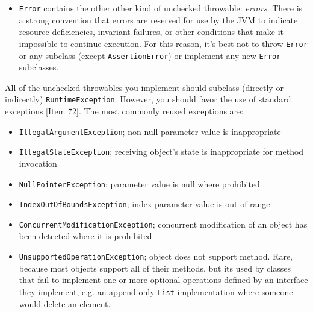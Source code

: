 \documentclass[table, xcdraw]{article}%
\begin{document}
\begin{itemize}
    All exceptions under \texttt{Exception} are checked, except those in subclass:
    \begin{itemize}
        \item \texttt{RuntimeException} contains \emph{unchecked exceptions}, which are not checked at compile time and are not required to -- and generally shouldn't -- be caught or declared in a \texttt{throws} clause.\footnote{In C++, all exceptions are unchecked, where it is up to the programmers to specify or catch the exceptions.} Recovery is often impossible and continued execution would do more harm than good. \emph{Runtime exceptions} should be used to indicate programming errors, most of which violate precondition violations (e.g. \texttt{IndexOutOfBoundsException}).
    \end{itemize}
    \item \texttt{Error} contains the other other kind of unchecked throwable: \emph{errors}. There is a strong convention that errors are reserved for use by the JVM to indicate resource deficiencies, invariant failures, or other conditions that make it impossible to continue execution. For this reason, it’s best not to throw \texttt{Error} or any subclass (except \texttt{AssertionError}) or implement any new \texttt{Error} subclasses.
\end{itemize}

All of the unchecked throwables you implement should subclass (directly or indirectly) \texttt{RuntimeException}. However, you should favor the use of standard exceptions [Item 72]. The most commonly reused exceptions are:

\begin{itemize}
    \item \texttt{IllegalArgumentException}; non-null parameter value is inappropriate
    \item \texttt{IllegalStateException}; receiving object's state is inappropriate for method invocation
    \item \texttt{NullPointerException}; parameter value is null where prohibited
    \item \texttt{IndexOutOfBoundsException}; index parameter value is out of range
    \item \texttt{ConcurrentModificationException}; concurrent modification of an object has been detected where it is prohibited
    \item \texttt{UnsupportedOperationException}; object does not support method. Rare, because most objects support all of their methods, but its used by classes that fail to implement one or more optional operations defined by an interface they implement, e.g. an append-only \texttt{List} implementation where someone would delete an element.
\end{itemize}
\end{document}

